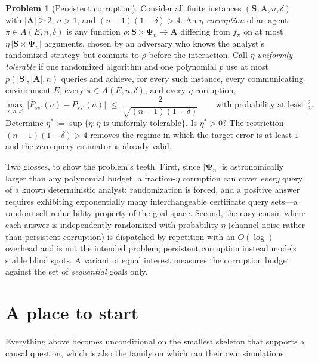 \documentclass[11pt]{amsart}
\theoremstyle{plain}
\theoremstyle{definition}
\newtheorem{problem}[theorem]{Problem}
\newcommand{\bS}{\mathbf{S}}
\newcommand{\bA}{\mathbf{A}}
\newcommand{\bPsi}{\boldsymbol{\Psi}}
\begin{document}
\begin{problem}[Persistent corruption]\label{prob:corruption}
Consider all finite instances $(\bS,\bA,n,\delta)$ with $|\bA|\ge2$, $n>1$, and $(n-1)(1-\delta)>4$. An \emph{$\eta$-corruption} of an agent $\pi\in A(E,n,\delta)$ is any function $\rho\colon\bS\times\bPsi_n\to\bA$ differing from $f_\pi$ on at most $\eta\,|\bS\times\bPsi_n|$ arguments, chosen by an adversary who knows the analyst's randomized strategy but commits to $\rho$ before the interaction. Call $\eta$ \emph{uniformly tolerable} if one randomized algorithm and one polynomial $p$ use at most $p(|\bS|,|\bA|,n)$ queries and achieve, for every such instance, every communicating environment $E$, every $\pi\in A(E,n,\delta)$, and every $\eta$-corruption,
\[
   \max_{s,a,s'}\,\bigl|\widehat P_{ss'}(a)-P_{ss'}(a)\bigr|\;\le\; \frac{2}{\sqrt{(n-1)(1-\delta)}}
   \qquad\text{with probability at least } \tfrac23.
\]
Determine $\eta^*:=\sup\{\eta:\eta\text{ is uniformly tolerable}\}$. Is $\eta^*>0$? The restriction $(n-1)(1-\delta)>4$ removes the regime in which the target error is at least $1$ and the zero-query estimator is already valid.
\end{problem}

Two glosses, to show the problem's teeth. First, since $|\bPsi_n|$ is astronomically larger than any polynomial budget, a fraction-$\eta$ corruption can cover \emph{every} query of a known deterministic analyst: randomization is forced, and a positive answer requires exhibiting exponentially many interchangeable certificate query sets---a random-self-reducibility property of the goal space. Second, the easy cousin where each answer is independently randomized with probability $\eta$ (channel noise rather than persistent corruption) is dispatched by repetition with an $O(\log)$ overhead and is not the intended problem; persistent corruption instead models stable blind spots. A variant of equal interest measures the corruption budget against the set of \emph{sequential} goals only.

\section{A place to start}\label{sec:starter}

Everything above becomes unconditional on the smallest skeleton that supports a causal question, which is also the family on which \cite{richens2024} ran their own simulations.
\end{document}
